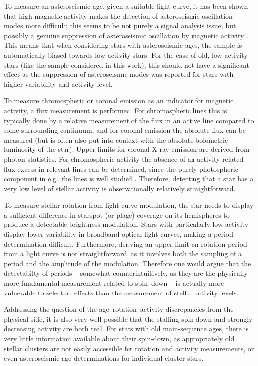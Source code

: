 To measure an asteroseismic age, given a suitable light curve, it has been shown that high magnetic activity makes the detection of asteroseismic oscillation modes more difficult; this seems to be not purely a signal analysis issue, but possibly a genuine suppression of asteroseismic oscillation by magnetic activity \citep{Chaplin_etal_2011_stellar_activity}. This means that when considering stars with asteroseismic ages, the sample is automatically biased towards low-activity stars. For the case of old, low-activity stars (like the sample considered in this work), this should not have a significant effect as the suppression of asteroseismic modes was reported for stars with higher variability and activity level.

To measure chromospheric or coronal emission as an indicator for magnetic activity, a flux measurement is performed. For chromospheric lines this is typically done by a relative measurement of the flux in an active line compared to some surrounding continuum, and for coronal emission the absolute flux can be measured (but is often also put into context with the absolute bolometric luminosity of the star). Upper limits for coronal X-ray emission are derived from photon statistics. For chromospheric activity the absence of an activity-related flux excess in relevant lines can be determined, since the purely photospheric component in e.g.\ the \caII lines is well studied \citep{Noyes_etal_1984}. Therefore, detecting that a star has a very low level of stellar activity is observationally relatively straightforward.

To measure stellar rotation from light curve modulation, the star needs to display a sufficient difference in starspot (or plage) coverage on its hemispheres to produce a detectable brightness modulation. Stars with particularly low activity display lower variability in broadband optical light curves, making a period determination difficult. Furthermore, deriving an upper limit on rotation period from a light curve is not straightforward, as it involves both the sampling of a period and the amplitude of the modulation. Therefore one would argue that the detectabilty of periods -- somewhat counterintuitively, as they are the physically more fundamental measurement related to spin--down -- is actually more vulnerable to selection effects than the measurement of stellar activity levels.

Addressing the question of the age--rotation--activity discrepancies from the physical side, it is also very well possible that the stalling spin-down and strongly decreasing activity are both real. For stars with old main-sequence ages, there is very little information available about their spin-down, as appropriately old stellar clusters are not easily accessible for rotation and activity measurements, or even asteroseismic age determinations for individual cluster stars. 

